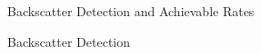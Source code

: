 \documentclass[journal]{IEEEtran}
\begin{document}
\begin{section}{Backscatter Detection and Achievable Rates}
\begin{subsection}{Backscatter Detection}





\end{subsection}
\end{section}
\end{document}
